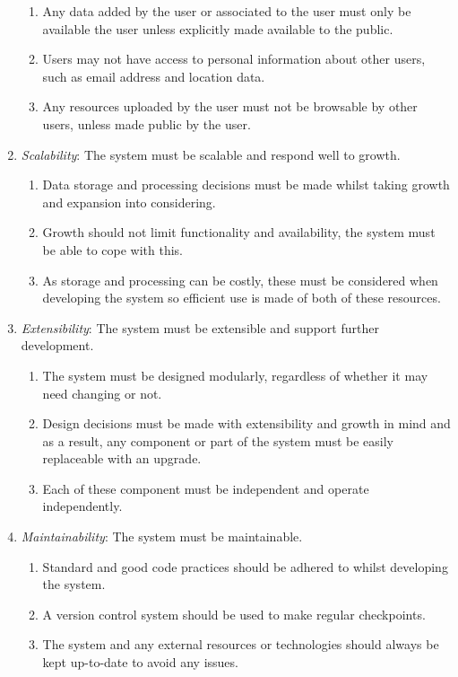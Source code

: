 \begin{enumerate}[label=\textbf{NF\arabic*}]
\begin{enumerate}[leftmargin=0.75in]
		\item Any data added by the user or associated to the user must only be available the user unless explicitly made available to the public.
		\item Users may not have access to personal information about other users, such as email address and location data.
		\item Any resources uploaded by the user must not be browsable by other users, unless made public by the user.
	\end{enumerate}
\item \textit{Scalability}: The system must be scalable and respond well to growth.
	\begin{enumerate}[leftmargin=0.75in]
		\item Data storage and processing decisions must be made whilst taking growth and expansion into considering.
		\item Growth should not limit functionality and availability, the system must be able to cope with this.
		\item As storage and processing can be costly, these must be considered when developing the system so efficient use is made of both of these resources.
	\end{enumerate}
\item \textit{Extensibility}: The system must be extensible and support further development.
	\begin{enumerate}[leftmargin=0.75in]
		\item The system must be designed modularly, regardless of whether it may need changing or not.
		\item Design decisions must be made with extensibility and growth in mind and as a result, any component or part of the system must be easily replaceable with an upgrade.
		\item Each of these component must be independent and operate independently.
	\end{enumerate}
\item \textit{Maintainability}: The system must be maintainable.
	\begin{enumerate}[leftmargin=0.75in]
		\item Standard and good code practices should be adhered to whilst developing the system.
		\item A version control system should be used to make regular checkpoints.
		\item The system and any external resources or technologies should always be kept up-to-date to avoid any issues.

\end{enumerate}
\end{enumerate}
